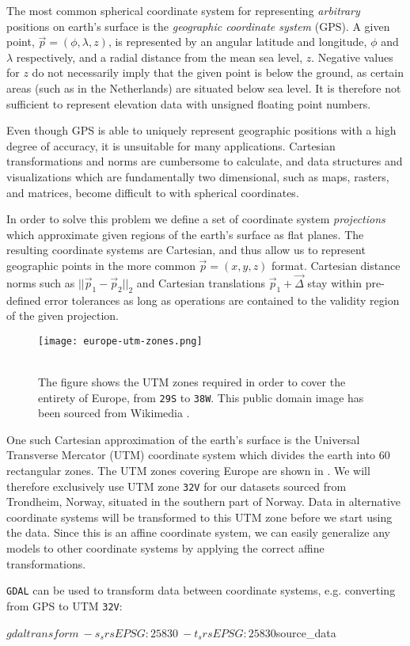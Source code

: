 The most common spherical coordinate system for representing \textit{arbitrary} positions on earth's surface is the \textit{geographic coordinate system} (GPS).
A given point, $\vec{p} = (\phi, \lambda, z)$, is represented by an angular latitude and longitude, $\phi$ and $\lambda$ respectively, and a radial distance from the mean sea level, $z$.
Negative values for $z$ do not necessarily imply that the given point is below the ground, as certain areas (such as in the Netherlands) are situated below sea level.
It is therefore not sufficient to represent elevation data with unsigned floating point numbers.

Even though GPS is able to uniquely represent geographic positions with a high degree of accuracy, it is unsuitable for many applications.
Cartesian transformations and norms are cumbersome to calculate, and data structures and visualizations which are fundamentally two dimensional, such as maps, rasters, and matrices, become difficult to with spherical coordinates.

In order to solve this problem we define a set of coordinate system \textit{projections} which approximate given regions of the earth's surface as flat planes.
The resulting coordinate systems are Cartesian, and thus allow us to represent geographic points in the more common $\vec{p} = (x, y, z)$ format.
Cartesian distance norms such as $||\vec{p}_1 - \vec{p}_2||_2$ and Cartesian translations $\vec{p}_1 + \vec{\Delta}$ stay within pre-defined error tolerances as long as operations are contained to the validity region of the given projection.

\begin{wrapfigure}[15]{r}{0.38\linewidth}
  \vspace{-1em}
  \centering
  \texttt{[image: europe-utm-zones.png]}
  \caption{
    \\
    The figure shows the UTM zones required in order to cover the entirety of Europe, from \texttt{29S} to \texttt{38W}.
    This public domain image has been sourced from Wikimedia \cite{wiki:europe_utm_zones}.
  }
  \label{fig:europe-utm-zones}
\end{wrapfigure}

One such Cartesian approximation of the earth's surface is the Universal Transverse Mercator (UTM) coordinate system which divides the earth into 60 rectangular zones. The UTM zones covering Europe are shown in .
We will therefore exclusively use UTM zone \texttt{32V} for our datasets sourced from Trondheim, Norway, situated in the southern part of Norway.
Data in alternative coordinate systems will be transformed to this UTM zone before we start using the data.
Since this is an affine coordinate system, we can easily generalize any models to other coordinate systems by applying the correct affine transformations.

\texttt{GDAL} can be used to transform data between coordinate systems, e.g. converting from GPS to UTM \texttt{32V}:
\begin{shellcode}
$ gdaltransform \
    -s_srs EPSG:25830 \
    -t_srs EPSG:25830 ${source_data}
\end{shellcode}
